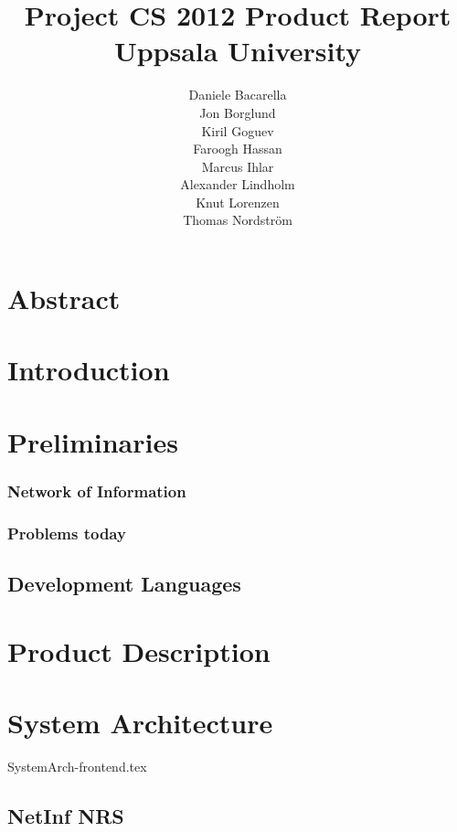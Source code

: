 \documentclass[11pt]{report}
\title{Project CS 2012 Product Report\\Uppsala University\\}
\author{Daniele Bacarella\\
		Jon Borglund\\
		Kiril Goguev\\
		Faroogh Hassan\\
		Marcus Ihlar\\
		Alexander Lindholm\\
		Knut Lorenzen\\
		Thomas Nordstr\"om\\
}
\date{}
\begin{document}
\maketitle

\tableofcontents

\chapter{Abstract}


\chapter{Introduction}


\chapter{Preliminaries}

\subsection{Network of Information}
\subsection{Problems  today}
\section{Development Languages}



\chapter{Product Description}







\chapter{System Architecture}

 {SystemArch-frontend.tex}

\section {NetInf NRS}
\end{document}

